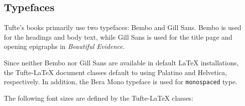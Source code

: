 \documentclass{tufte-book}
\newcommand{\BE}{\textit{Beautiful Evidence}\xspace}
\newcommand{\TL}{Tufte-\LaTeX\xspace}
\begin{document}
\begin{figure}[p]
\hfill
{}
\end{figure}

\subsection{Typefaces}\label{sec:typefaces1}

 

Tufte's books primarily use two typefaces: Bembo and Gill Sans. Bembo is
used for the headings and body text, while Gill Sans is used for the
title page and opening epigraphs in \BE.

Since neither Bembo nor Gill Sans are available in default \LaTeX{}
installations, the \TL document classes default to using Palatino and
Helvetica, respectively. In addition, the Bera Mono typeface is used for
\texttt{monospaced} type.

The following font sizes are defined by the \TL classes:
\end{document}
